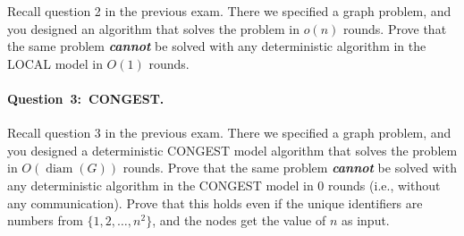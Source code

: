 \documentclass[12pt,a4paper]{article}
\newcommand{\q}[2]{\paragraph{\mbox{Question #1: }#2.}}
\newcommand{\hl}[1]{\textbf{\emph{#1}}}
\newcommand{\cemph}[1]{\textcolor{hlcolor}{\textbf{\emph{\boldmath #1}}}}
\DeclareMathOperator{\diam}{diam}
\begin{document}
Recall question 2 in the previous exam. There we specified a graph problem, and you designed an algorithm that solves the problem in \cemph{$o(n)$} rounds. Prove that the same problem \hl{cannot} be solved with any deterministic algorithm in the LOCAL model in \cemph{$O(1)$} rounds.

\q{3}{CONGEST}

Recall question 3 in the previous exam. There we specified a graph problem, and you designed a deterministic CONGEST model algorithm that solves the problem in \cemph{$O(\diam(G))$} rounds. Prove that the same problem \hl{cannot} be solved with any deterministic algorithm in the CONGEST model in \cemph{$0$} rounds (i.e., without any communication). Prove that this holds even if the unique identifiers are numbers from $\{1,2,\dotsc,n^2\}$, and the nodes get the value of $n$ as input.
\end{document}
